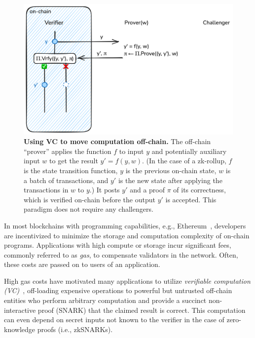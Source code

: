  \begin{figure}[tbh]
    \includegraphics[width=\textwidth]{naysayer/figs/vc.png}
    \caption{\textbf{Using VC to move computation off-chain.} The off-chain ``prover'' applies the function $f$ to input $y$ and potentially auxiliary input $w$ to get the result $y' = f(y, w)$. (In the case of a zk-rollup, $f$ is the state transition function, $y$ is the previous on-chain state, $w$ is a batch of transactions, and $y'$ is the new state after applying the transactions in $w$ to $y$.) It posts $y'$ and a proof $\pi$ of its correctness, which is verified on-chain before the output $y'$ is accepted. This paradigm does not require any challengers.}
    \label{fig:vc}
 \end{figure}

In most blockchains with programming capabilities, e.g., Ethereum~\cite{ethereum_yellowpaper}, developers are incentivized to minimize the storage and computation complexity of on-chain programs. Applications with high compute or storage incur significant fees, commonly referred to as \emph{gas}, to compensate validators in the network. Often, these costs are passed on to users of an application. 

High gas costs have motivated many applications to utilize \emph{verifiable computation (VC)}~\cite{C:GenGenPar10}, off-loading expensive operations to powerful but untrusted off-chain entities who perform arbitrary computation and provide a succinct non-interactive proof (SNARK) that the claimed result is correct.
This computation can even depend on secret inputs not known to the verifier in the case of zero-knowledge proofs (i.e., zkSNARKs).

